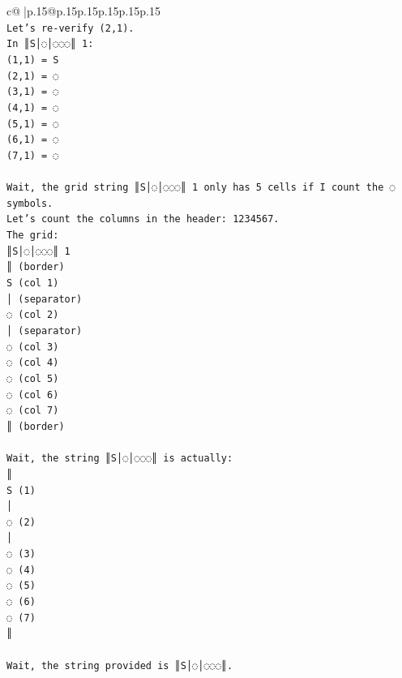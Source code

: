 \documentclass{article}
\begin{document}
{\begin{supertabular}{c@{$\;$}|p{.15\linewidth}@{}p{.15\linewidth}p{.15\linewidth}p{.15\linewidth}p{.15\linewidth}p{.15\linewidth}}
{{{\\ 
\texttt{Let's re{-}verify (2,1).} \\
\texttt{In ║S│◌│◌◌◌║ 1:} \\
\texttt{(1,1) = S} \\
\texttt{(2,1) = ◌} \\
\texttt{(3,1) = ◌} \\
\texttt{(4,1) = ◌} \\
\texttt{(5,1) = ◌} \\
\texttt{(6,1) = ◌} \\
\texttt{(7,1) = ◌} \\
\\ 
\texttt{Wait, the grid string ║S│◌│◌◌◌║ 1 only has 5 cells if I count the ◌ symbols.} \\
\texttt{Let's count the columns in the header:  1234567.} \\
\texttt{The grid:} \\
\texttt{║S│◌│◌◌◌║ 1} \\
\texttt{║ (border)} \\
\texttt{S (col 1)} \\
\texttt{│ (separator)} \\
\texttt{◌ (col 2)} \\
\texttt{│ (separator)} \\
\texttt{◌ (col 3)} \\
\texttt{◌ (col 4)} \\
\texttt{◌ (col 5)} \\
\texttt{◌ (col 6)} \\
\texttt{◌ (col 7)} \\
\texttt{║ (border)} \\
\\ 
\texttt{Wait, the string ║S│◌│◌◌◌║ is actually:} \\
\texttt{║} \\
\texttt{S (1)} \\
\texttt{│} \\
\texttt{◌ (2)} \\
\texttt{│} \\
\texttt{◌ (3)} \\
\texttt{◌ (4)} \\
\texttt{◌ (5)} \\
\texttt{◌ (6)} \\
\texttt{◌ (7)} \\
\texttt{║} \\
\\ 
\texttt{Wait, the string provided is ║S│◌│◌◌◌║.} \\
}}}
\end{supertabular}}
\end{document}
